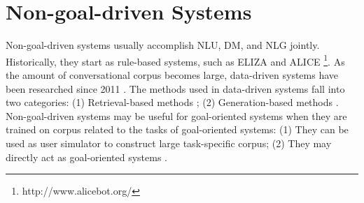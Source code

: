 \section{Non-goal-driven Systems} \label{Non-goal-driven Systems}

Non-goal-driven systems usually accomplish NLU, DM, and NLG jointly. Historically, they start as rule-based systems, such as ELIZA \cite{Weizenbaum1966Eliza} and ALICE \footnote{http://www.alicebot.org/}. As the amount of conversational corpus becomes large, data-driven systems have been researched since 2011 \cite{Ritter2011Data}. The methods used in data-driven systems fall into two categories: (1) Retrieval-based methods \cite{Ji2014An, Yan2016DocChat}; (2) Generation-based methods \cite{Ritter2011Data, Shang2015Neural, Sordoni2015a, Serban2016}. Non-goal-driven systems may be useful for goal-oriented systems when they are trained on corpus related to the tasks of goal-oriented systems: (1) They can be used as user simulator to construct large task-specific corpus; (2) They may directly act as goal-oriented systems \cite{Vinyals2015A}.




